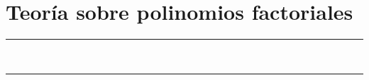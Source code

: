 \pagestyle{plain}
\chapter{Teoría sobre polinomios factoriales}\label{app:ApendiceII}
\vspace{0.2cm}
\rule{\linewidth}{1.5pt}\\
\startcontents[chapters]
\vspace{0.2cm}
\rule{\linewidth}{1.5pt}\\
\newpage
